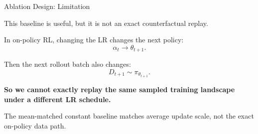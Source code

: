 \documentclass[aspectratio=169]{beamer}
\begin{document}
\begin{frame}{Ablation Design: Limitation}
\small

This baseline is useful, but it is not an exact counterfactual replay.

\vspace{0.8em}

In on-policy RL, changing the LR changes the next policy:
\[
  \alpha_t
  \longrightarrow
  \theta_{t+1}.
\]

\vspace{0.6em}

Then the next rollout batch also changes:
\[
  D_{t+1}
  \sim
  \pi_{\theta_{t+1}}.
\]

\vspace{0.8em}

\begin{center}
\large
\textbf{So we cannot exactly replay the same sampled training landscape under a different LR schedule.}
\end{center}

\vspace{0.6em}

{\footnotesize\color{Muted}
The mean-matched constant baseline matches average update scale,
not the exact on-policy data path.
}

\end{frame}
\end{document}
